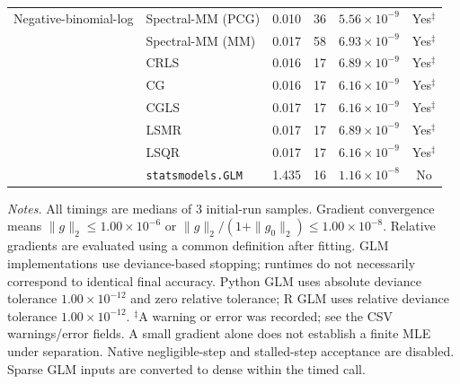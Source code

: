 \documentclass[10pt,a4paper]{article}
\begin{document}
\begin{longtable}{llrrrc}
\midrule
Negative-binomial-log & Spectral-MM (PCG) & 0.010 & 36 & $5.56\times10^{-9}$ & Yes$^{\ddagger}$ \\
 & Spectral-MM (MM) & 0.017 & 58 & $6.93\times10^{-9}$ & Yes$^{\ddagger}$ \\
 & CRLS & 0.016 & 17 & $6.89\times10^{-9}$ & Yes$^{\ddagger}$ \\
 & CG & 0.016 & 17 & $6.16\times10^{-9}$ & Yes$^{\ddagger}$ \\
 & CGLS & 0.017 & 17 & $6.16\times10^{-9}$ & Yes$^{\ddagger}$ \\
 & LSMR & 0.017 & 17 & $6.89\times10^{-9}$ & Yes$^{\ddagger}$ \\
 & LSQR & 0.017 & 17 & $6.16\times10^{-9}$ & Yes$^{\ddagger}$ \\
 & \texttt{statsmodels.GLM} & 1.435 & 16 & $1.16\times10^{-8}$ & No \\
\end{longtable}
\noindent\textit{Notes.} All timings are medians of 3 initial-run samples.
Gradient convergence means $\|g\|_2\leq 1.00\times10^{-6}$ or $\|g\|_2/(1+\|g_0\|_2)\leq 1.00\times10^{-8}$.
Relative gradients are evaluated using a common definition after fitting. GLM implementations use deviance-based stopping; runtimes do not necessarily correspond to identical final accuracy.
Python GLM uses absolute deviance tolerance $1.00\times10^{-12}$ and zero relative tolerance; R GLM uses relative deviance tolerance $1.00\times10^{-12}$.
$^{\ddagger}$A warning or error was recorded; see the CSV warnings/error fields. A small gradient alone does not establish a finite MLE under separation.
Native negligible-step and stalled-step acceptance are disabled.
Sparse GLM inputs are converted to dense within the timed call.
\par
\endgroup
\end{document}
